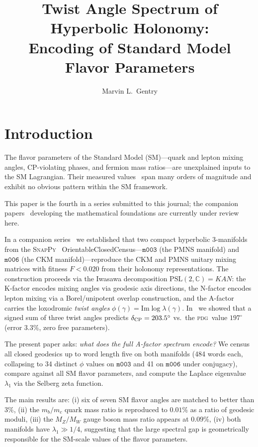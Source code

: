 \documentclass[a4paper,11pt]{article}
\title{\boldmath Twist Angle Spectrum of Hyperbolic Holonomy:\\
Encoding of Standard Model Flavor Parameters}
\author{Marvin L.~Gentry}
\affiliation{Independent Researcher, Seattle, WA, USA}
\newcommand{\PSL}{\mathrm{PSL}(2,\mathbb{C})}
\newcommand{\mfld}[1]{\texttt{#1}}
\newcommand{\degr}{^{\circ}}
\newcommand{\PDG}{\textsc{pdg}}
\begin{document}
\maketitle

\section{Introduction}
\label{sec:intro}

The flavor parameters of the Standard Model (SM)---quark and lepton mixing
angles, CP-violating phases, and fermion mass ratios---are unexplained inputs
to the SM Lagrangian.
Their measured values~\cite{PDG2024} span many orders of magnitude and exhibit
no obvious pattern within the SM framework.

This paper is the fourth in a series submitted to this journal; the companion papers~\cite{GentryNPB1,GentryNPB2,GentryNPB3} developing the mathematical foundations are currently under review here.

In a companion series~\cite{GentryCKM,GentryPMNS,GentryCP} we established that
two compact hyperbolic 3-manifolds from the \textsc{SnapPy}~\cite{SnapPy}
OrientableClosedCensus---$\mfld{m003}$ (the PMNS manifold) and $\mfld{m006}$
(the CKM manifold)---reproduce the CKM and PMNS unitary mixing matrices with
fitness $F < 0.020$ from their holonomy representations.
The construction proceeds via the Iwasawa decomposition
$\PSL = KAN$: the K-factor encodes mixing angles via geodesic axis directions,
the N-factor encodes lepton mixing via a Borel/unipotent overlap construction,
and the A-factor carries the loxodromic \emph{twist angles}
$\phi(\gamma) = \mathrm{Im}\log\lambda(\gamma)$.
In~\cite{GentryCP} we showed that a signed sum of three twist angles predicts
$\delta_{\rm CP} = 203.5\degr$ vs.\ the \PDG\ value $197\degr$ (error $3.3\%$,
zero free parameters).

The present paper asks: \emph{what does the full A-factor spectrum encode?}
We census all closed geodesics up to word length five on both manifolds
(484 words each, collapsing to 34 distinct $\phi$ values on $\mfld{m003}$
and 41 on $\mfld{m006}$ under conjugacy), compare against all SM flavor
parameters, and compute the Laplace eigenvalue $\lambda_1$ via the Selberg
zeta function.

The main results are:
(i) six of seven SM flavor angles are matched to better than $3\%$,
(ii) the $m_b/m_c$ quark mass ratio is reproduced to $0.01\%$ as a ratio of
geodesic moduli,
(iii) the $M_Z/M_W$ gauge boson mass ratio appears at $0.09\%$,
(iv) both manifolds have $\lambda_1 \gg 1/4$, suggesting that the large spectral
gap is geometrically responsible for the SM-scale values of the flavor parameters.
\end{document}
